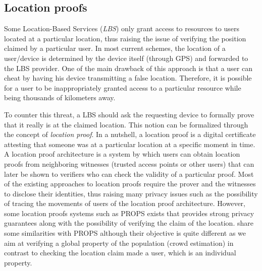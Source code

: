 \subsection{Location proofs}

Some Location-Based Services (\emph{LBS}) only grant access to resources to users located at a particular location,  thus raising the issue of verifying the position claimed by a particular user. 
In most current schemes, the location of a user/device is determined by the device itself (\eg through GPS) and forwarded to the LBS provider. 
One of the main drawback of this approach is that a user can cheat by having his device transmitting a false location. 
Therefore, it is possible for a user to be inappropriately granted access to a particular resource while being thousands of kilometers away.

To counter this threat, a LBS should ask the requesting device to formally prove that it really is at the claimed location. This notion can be formalized through the concept of \emph{location proof}. 
In a nutshell, a location proof is a digital certificate attesting that someone was at a particular location at a specific moment in time. A location proof architecture is a system by which users can obtain location proofs from neighboring witnesses (\eg trusted access points or other users) that can later be shown to verifiers who can check the validity of a particular proof. 
Most of the existing approaches to location proofs require the prover and the witnesses to disclose their identities, thus raising many privacy issues such as the possibility of tracing the movements of users of the location proof architecture.
However, some location proofs systems such as PROPS exists that provides strong privacy guarantees along with the possibility of verifying the claim of the location. 
\PRIVO share some similarities with PROPS although their objective is quite different as we aim at verifying a global property of the population (\ie crowd estimation) in contrast to checking the location claim made a user, which is an individual property. 
